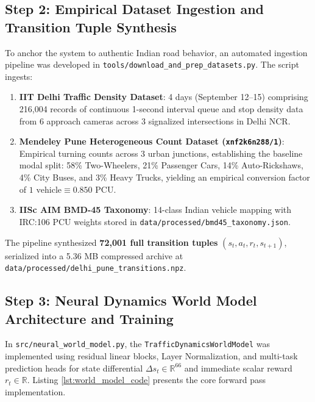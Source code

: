 \subsection*{Step 2: Empirical Dataset Ingestion and Transition Tuple Synthesis}
To anchor the system to authentic Indian road behavior, an automated ingestion pipeline was developed in \texttt{tools/download\_and\_prep\_datasets.py}. The script ingests:
\begin{enumerate}
    \item \textbf{IIT Delhi Traffic Density Dataset}: 4 days (September 12--15) comprising 216,004 records of continuous 1-second interval queue and stop density data from 6 approach cameras across 3 signalized intersections in Delhi NCR.
    \item \textbf{Mendeley Pune Heterogeneous Count Dataset (\texttt{xnf2k6n288/1})}: Empirical turning counts across 3 urban junctions, establishing the baseline modal split: 58\% Two-Wheelers, 21\% Passenger Cars, 14\% Auto-Rickshaws, 4\% City Buses, and 3\% Heavy Trucks, yielding an empirical conversion factor of $1 \text{ vehicle} \equiv 0.850 \text{ PCU}$.
    \item \textbf{IISc AIM BMD-45 Taxonomy}: 14-class Indian vehicle mapping with IRC:106 PCU weights stored in \texttt{data/processed/bmd45\_taxonomy.json}.
\end{enumerate}
The pipeline synthesized \textbf{72,001 full transition tuples} $(s_t, a_t, r_t, s_{t+1})$, serialized into a 5.36 MB compressed archive at \texttt{data/processed/delhi\_pune\_transitions.npz}.

\subsection*{Step 3: Neural Dynamics World Model Architecture and Training}
In \texttt{src/neural\_world\_model.py}, the \texttt{TrafficDynamicsWorldModel} was implemented using residual linear blocks, Layer Normalization, and multi-task prediction heads for state differential $\Delta s_t \in \mathbb{R}^{66}$ and immediate scalar reward $r_t \in \mathbb{R}$. Listing \ref{lst:world_model_code} presents the core forward pass implementation.


